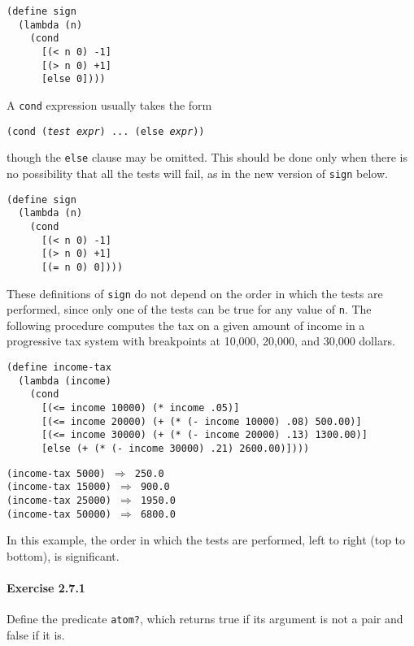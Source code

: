 \begin{alltt}
(define sign
  (lambda (n)
    (cond
      [(\textless{} n 0) -1]
      [(\textgreater{} n 0) +1]
      [else 0])))
\end{alltt}


A \texttt{cond} expression usually takes the form


\texttt{(cond (\textit{test} \textit{expr}) ... (else \textit{expr}))}

though the \texttt{else} clause may be omitted.
This should be done only when there is no possibility that all the tests
will fail, as in the new version of \texttt{sign} below.


\begin{alltt}
(define sign
  (lambda (n)
    (cond
      [(\textless{} n 0) -1]
      [(\textgreater{} n 0) +1]
      [(= n 0) 0])))
\end{alltt}


These definitions of \texttt{sign} do not depend on the order in which the
tests are performed, since only one of the tests can be true for any
value of \texttt{n}.
The following procedure computes the tax on a given amount of income in
a progressive tax system with breakpoints at 10,000, 20,000, and 30,000
dollars.


\begin{alltt}
(define income-tax
  (lambda (income)
    (cond
      [(\textless{}= income 10000) (* income .05)]
      [(\textless{}= income 20000) (+ (* (- income 10000) .08) 500.00)]
      [(\textless{}= income 30000) (+ (* (- income 20000) .13) 1300.00)]
      [else (+ (* (- income 30000) .21) 2600.00)])))
\end{alltt}


\begin{alltt}
(income-tax 5000) \(\Rightarrow\) 250.0
(income-tax 15000) \(\Rightarrow\) 900.0
(income-tax 25000) \(\Rightarrow\) 1950.0
(income-tax 50000) \(\Rightarrow\) 6800.0
\end{alltt}


In this example, the order in which the tests are performed,
left to right (top to bottom), is significant.


\paragraph{Exercise \label{start_g30}2.7.1}


\label{start_s126}Define the predicate \label{start_s127}\texttt{atom?}, which returns true if its argument
is not a pair and false if it is.




